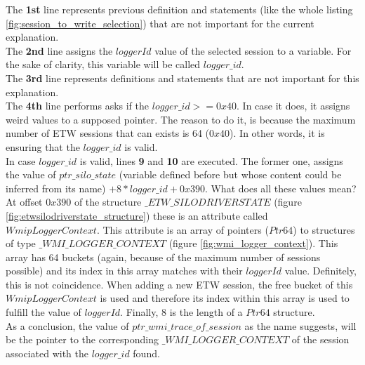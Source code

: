 The {\bfseries 1st} line represents previous definition and statements (like the whole listing \ref{fig:session_to_write_selection}) that are not important for the current explanation. \\
The {\bfseries 2nd} line assigns the $loggerId$ value of the selected session to a variable. For the sake of clarity, this variable will be called $logger\_id$.\\
The {\bfseries 3rd} line represents definitions and statements that are not important for this explanation.\\
The {\bfseries 4th} line performs asks if the $logger\_id >= 0x40$. In case it does, it assigns weird values to a supposed pointer. The reason to do it, is because the maximum number of ETW sessions that can exists is 64 ($0x40$). In other words, it is ensuring that the $logger\_id$ is valid. \\
In case $logger\_id$ is valid, lines {\bfseries 9} and {\bfseries 10} are executed. The former one, assigns the value of $ptr\_silo\_state$ (variable defined before but whose content could be inferred from its name) $+ 8 * logger\_id + 0x390$. What does all these values mean? 
At offset $0x390$ of the structure $\_ETW\_SILODRIVERSTATE$ (figure \ref{fig:etwsilodriverstate_structure}) these is an attribute called $WmipLoggerContext$. This attribute is an array of pointers ($Ptr64$) to structures of type $\_WMI\_LOGGER\_CONTEXT$ (figure \ref{fig:wmi_logger_context}). This array has 64 buckets (again, because of the maximum number of sessions possible) and its index in this array matches with their $loggerId$ value. Definitely, this is not coincidence. When adding a new ETW session, the free bucket of this $WmipLoggerContext$ is used and therefore its index within this array is used to fulfill the value of $loggerId$. Finally, $8$ is the length of a $Ptr64$ structure. \\
As a conclusion, the value of $ptr\_wmi\_trace\_of\_session$ as the name suggests, will be the pointer to the corresponding $\_WMI\_LOGGER\_CONTEXT$ of the session associated with the $logger\_id$ found. 

















